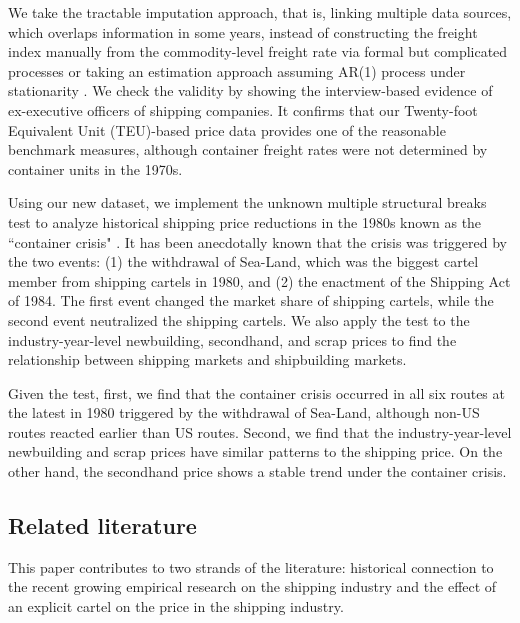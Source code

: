 \documentclass[11pt]{article}
\begin{document}
We take the tractable imputation approach, that is, linking multiple data sources, which overlaps information in some years, instead of constructing the freight index manually from the commodity-level freight rate via formal but complicated processes or taking an estimation approach assuming AR(1) process under stationarity \citep{jeon2022learning}. We check the validity by showing the interview-based evidence of ex-executive officers of shipping companies. It confirms that our Twenty-foot Equivalent Unit (TEU)-based price data provides one of the reasonable benchmark measures, although container freight rates were not determined by container units in the 1970s.

Using our new dataset, we implement the unknown multiple structural breaks test \citep{bai1998estimating,bai2003computation} to analyze historical shipping price reductions in the 1980s known as the ``container crisis" \citep{broeze2002globalisation}. It has been anecdotally known that the crisis was triggered by the two events: (1) the withdrawal of Sea-Land, which was the biggest cartel member from shipping cartels in 1980, and (2) the enactment of the Shipping Act of 1984. The first event changed the market share of shipping cartels, while the second event neutralized the shipping cartels. We also apply the test to the industry-year-level newbuilding, secondhand, and scrap prices to find the relationship between shipping markets and shipbuilding markets.

Given the test, first, we find that the container crisis occurred in all six routes at the latest in 1980 triggered by the withdrawal of Sea-Land, although non-US routes reacted earlier than US routes. Second, we find that the industry-year-level newbuilding and scrap prices have similar patterns to the shipping price. On the other hand, the secondhand price shows a stable trend under the container crisis.


\subsection{Related literature}\label{subsec:litereture}

This paper contributes to two strands of the literature: historical connection to the recent growing empirical research on the shipping industry and the effect of an explicit cartel on the price in the shipping industry.
\end{document}
